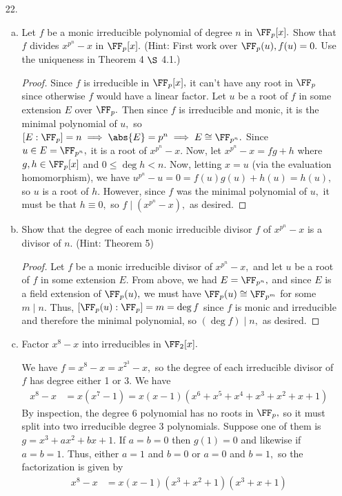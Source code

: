 \documentclass{article}
\begin{document}
\begin{itemize}
		\newpage
	\item[22.]
		\begin{enumerate}[(a)]
			\item Let $f$ be a monic irreducible polynomial of degree $n$ in $\FF_p[x].$ Show that $f$ divides $x^{p^n}-x$ in $\FF_p[x].$ (Hint: First work over $\FF_p(u), f(u)=0.$ Use the uniqueness in Theorem 4 $\S$ 4.1.)
				\begin{proof}
					Since $f$ is irreducible in $\FF_p[x],$ it can't have any root in $\FF_p$ since otherwise $f$ would have a linear factor. Let $u$ be a root of $f$ in some extension $E$ over $\FF_p.$ Then since $f$ is irreducible and monic, it is the minimal polynomial of $u,$ so $[E:\FF_p] = n\implies \abs{E}=p^n \implies E\cong \FF_{p^n}.$ Since $u\in E=\FF_{p^n},$ it is a root of $x^{p^n}-x.$ Now, let $x^{p^n}-x=fg+h$ where $g, h\in \FF_p[x]$ and $0\le \deg h < n.$ Now, letting $x=u$ (via the evaluation homomorphism), we have $u^{p^n}-u=0=f(u)g(u) + h(u) = h(u),$ so $u$ is a root of $h.$ However, since $f$ was the minimal polynomial of $u,$ it must be that $h\equiv0,$ so $f\mid (x^{p^n}-x),$ as desired.
				\end{proof}

			\item Show that the degree of each monic irreducible divisor $f$ of $x^{p^n}-x$ is a divisor of $n.$ (Hint: Theorem 5)
				\begin{proof}
					Let $f$ be a monic irreducible divisor of $x^{p^n}-x,$ and let $u$ be a root of $f$ in some extension $E.$ From above, we had $E=\FF_{p^n},$ and since $E$ is a field extension of $\FF_p(u),$ we must have $\FF_p(u)\cong \FF_{p^m}$ for some $m\mid n.$ Thus, $[\FF_p(u):\FF_p]= m=\deg f$ since $f$ is monic and irreducible and therefore the minimal polynomial, so $(\deg f)\mid n,$ as desired.
				\end{proof}

			\item Factor $x^8-x$ into irreducibles in $\FF_2[x].$
				\begin{soln}
					We have $f=x^8-x=x^{2^3} - x,$ so the degree of each irreducible divisor of $f$ has degree either 1 or 3. We have
					\begin{align*}
						x^8-x &= x(x^7-1) = x(x-1)(x^6+x^5+x^4+x^3+x^2+x+1)
					\end{align*}
					By inspection, the degree 6 polynomial has no roots in $\FF_p,$ so it must split into two irreducible degree 3 polynomials. Suppose one of them is $g=x^3+ax^2+bx+1.$ If $a=b=0$ then $g(1)=0$ and likewise if $a=b=1.$ Thus, either $a=1$ and $b=0$ or $a=0$ and $b=1,$ so the factorization is given by
					\begin{align*}
						x^8-x &= x(x-1)(x^3+x^2+1)(x^3+x+1)
					\end{align*}
				\end{soln}

		\end{enumerate}
		
\end{itemize}
\end{document}
